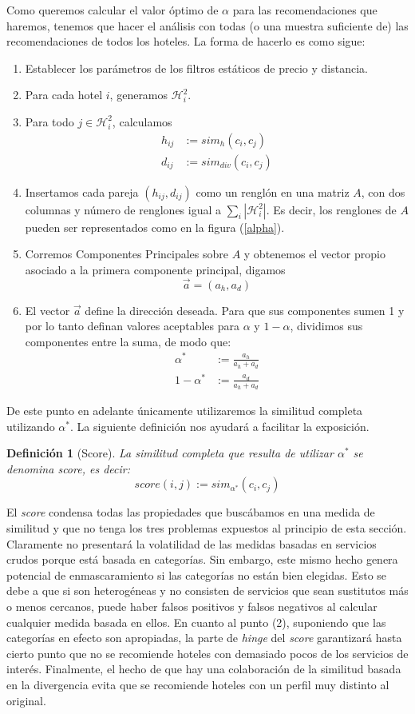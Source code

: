 \documentclass[12pt]{report}
\newcommand{\HH}{\mathcal{H}}
\newtheorem{defn}{Definici\'on}[chapter]
\begin{document}
Como queremos calcular el valor óptimo de $\alpha$ para las recomendaciones que haremos, tenemos que hacer el análisis con todas (o una muestra suficiente de) las recomendaciones de todos los hoteles. La forma de hacerlo es como sigue:
\begin{enumerate}
	\item Establecer los parámetros de los filtros estáticos de precio y distancia.
	\item Para cada hotel $i$, generamos $\HH_i^2$.
	\item Para todo $j \in \HH_i^2$, calculamos
	\begin{align*}
		h_{ij} &:= sim_h(c_i, c_j)\\
		d_{ij} &:= sim_{div}(c_i, c_j)
	\end{align*}
	\item Insertamos cada pareja $(h_{ij}, d_{ij})$ como un renglón en una matriz $A$, con dos columnas y número de renglones igual a $\sum_i |\HH_i^2|$. Es decir, los renglones de $A$ pueden ser representados como en la figura (\ref{alpha}).
	\item Corremos Componentes Principales sobre $A$ y obtenemos el vector propio asociado a la primera componente principal, digamos
	\[
	\vec{a} = (a_h, a_d)
	\]
	\item El vector $\vec{a}$ define la dirección deseada. Para que sus componentes sumen 1 y por lo tanto definan valores aceptables para $\alpha$ y $1 - \alpha$, dividimos sus componentes entre la suma, de modo que:
	\begin{align*}
		\alpha^* &:= \frac{a_h}{a_h + a_d}\\
		1 - \alpha^* &:= \frac{a_d}{a_h + a_d}
	\end{align*}
\end{enumerate}
De este punto en adelante únicamente utilizaremos la similitud completa utilizando $\alpha^*$. La siguiente definición nos ayudará a facilitar la exposición.
\begin{defn}[Score]
La similitud completa que resulta de utilizar $\alpha^*$ se denomina \emph{score}, es decir:
\[
score(i,j) := sim_{\alpha^*}(c_i, c_j)
\]
\end{defn}
El \emph{score} condensa todas las propiedades que buscábamos en una medida de similitud y que no tenga los tres problemas expuestos al principio de esta sección. Claramente no presentará la volatilidad de las medidas basadas en servicios crudos porque está basada en categorías. Sin embargo, este mismo hecho genera potencial de enmascaramiento si las categorías no están bien elegidas. Esto se debe a que si son heterogéneas y no consisten de servicios que sean sustitutos más o menos cercanos, puede haber falsos positivos y falsos negativos al calcular cualquier medida basada en ellos. En cuanto al punto (2), suponiendo que las categorías en efecto son apropiadas, la parte de \emph{hinge} del \emph{score} garantizará hasta cierto punto que no se recomiende hoteles con demasiado pocos de los servicios de interés. Finalmente, el hecho de que hay una colaboración de la similitud basada en la divergencia evita que se recomiende hoteles con un perfil muy distinto al original.
\end{document}
